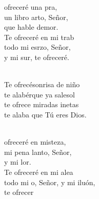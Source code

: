 \documentclass[12pt]{article}
\begin{document}
\begin{multicols*}{2}
\begin{cancion}%
	 ofreceré una pra, \\
	un libro arto, Señor,\\
	que hable demor. \\
	Te ofreceré en mi trab\\
	todo mi esrzo, Señor, \\
	y mi sur, te ofreceré.\\\jump\\
	\begin{chorus}%
	Te ofrecésonrisa de niño\\
	te alabérque ya salesol\\
	te ofrece miradas inetas \\
	te alaba que Tú eres Dios. \\
	\end{chorus}%
	\jump\\
	 ofreceré en misteza, \\
	mi pena lanto, Señor,\\
	y mi lor. \\
	Te ofreceré en mi alea\\
	todo mi o, Señor, y mi iluón,\\
	te ofrecer\\
\end{cancion}%


\end{multicols*}
\end{document}
